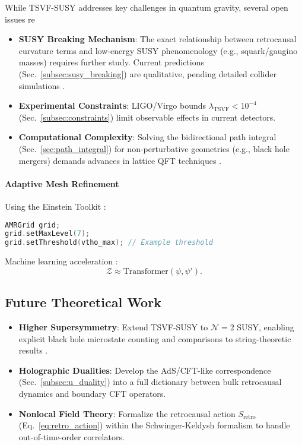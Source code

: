 \documentclass[twocolumn,superscriptaddress,floatfix]{revtex4-2}
\begin{document}
While TSVF-SUSY addresses key challenges in quantum gravity, several open issues re  
\begin{itemize}  
\item \textbf{SUSY Breaking Mechanism}: The exact relationship between retrocausal curvature terms and low-energy SUSY phenomenology (e.g., squark/gaugino masses) requires further study. Current predictions (Sec.~\ref{subsec:susy_breaking}) are qualitative, pending detailed collider simulations \cite{Allanach2021}.  
\item \textbf{Experimental Constraints}: LIGO/Virgo bounds \(\lambda_{\text{TSVF}} < 10^{-4}\) (Sec.~\ref{subsec:constraints}) limit observable effects in current detectors.  
\item \textbf{Computational Complexity}: Solving the bidirectional path integral (Sec.~\ref{sec:path_integral}) for non-perturbative geometries (e.g., black hole mergers) demands advances in lattice QFT techniques \cite{Lehner2019}.  
\end{itemize}  

\paragraph{Adaptive Mesh Refinement}
Using the Einstein Toolkit \cite{EinsteinToolkit2023}:
\begin{lstlisting}[language=C++, basicstyle=\small\ttfamily]
AMRGrid grid;
grid.setMaxLevel(7);
grid.setThreshold(vtho_max); // Example threshold
\end{lstlisting}

Machine learning acceleration \cite{George2023}:
\begin{equation}
\mathcal{Z} \approx \text{Transformer}(\psi, \psi').
\end{equation}

\subsection{Future Theoretical Work}  
\label{subsec:future_theory}  

\begin{itemize}  
\item \textbf{Higher Supersymmetry}: Extend TSVF-SUSY to \(\mathcal{N}=2\) SUSY, enabling explicit black hole microstate counting \cite{Strominger1996} and comparisons to string-theoretic results \cite{Sen2008}.  
\item \textbf{Holographic Dualities}: Develop the AdS/CFT-like correspondence (Sec.~\ref{subsec:u_duality}) into a full dictionary between bulk retrocausal dynamics and boundary CFT operators.  
\item \textbf{Nonlocal Field Theory}: Formalize the retrocausal action \(S_{\text{retro}}\) (Eq.~\ref{eq:retro_action}) within the Schwinger-Keldysh formalism \cite{Haehl2017} to handle out-of-time-order correlators.  
\end{itemize}  
\end{document}
